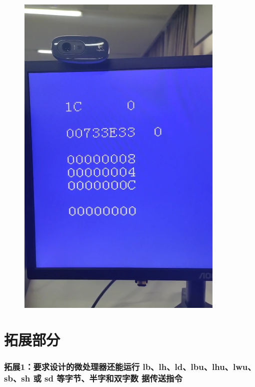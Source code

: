 \documentclass[12pt,hyperref,a4paper,UTF8]{ctexart}
\begin{document}
\begin{figure}[H]
\begin{minipage}[b]{0.24\textwidth}
        \includegraphics[width=\textwidth]{figures/fig/fram4.png}
    \end{minipage}
\end{figure}


\newpage


\section{拓展部分}
\subsubsection*{\Large 拓展1：要求设计的微处理器还能运行 lb、lh、ld、lbu、lhu、lwu、sb、sh 或 sd 等字节、半字和双字数
据传送指令}
\normalsize
\end{document}
